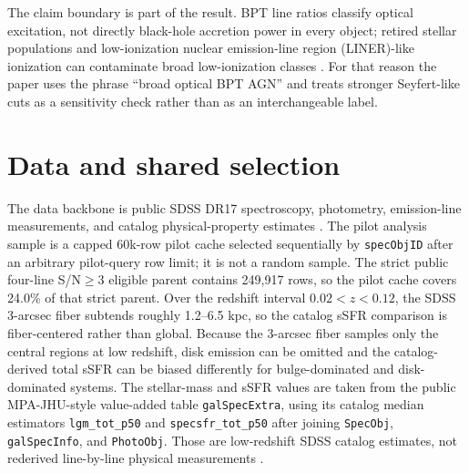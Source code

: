 \documentclass[twocolumn]{aastex631}
\begin{document}
The claim boundary is part of the result. BPT line ratios classify optical excitation, not directly black-hole accretion power in every object; retired stellar populations and low-ionization nuclear emission-line region (LINER)-like ionization can contaminate broad low-ionization classes \citep{stasinska2008,stasinska2015}. For that reason the paper uses the phrase ``broad optical BPT AGN'' and treats stronger Seyfert-like cuts as a sensitivity check rather than as an interchangeable label.

\section{Data and shared selection}
The data backbone is public SDSS DR17 spectroscopy, photometry, emission-line measurements, and catalog physical-property estimates \citep{york2000,sdssdr17,brinchmann2004}. The pilot analysis sample is a capped 60k-row pilot cache selected sequentially by \texttt{specObjID} after an arbitrary pilot-query row limit; it is not a random sample. The strict public four-line S/N$\geq3$ eligible parent contains 249,917 rows, so the pilot cache covers 24.0\% of that strict parent.
Over the redshift interval $0.02<z<0.12$, the SDSS 3-arcsec fiber subtends roughly 1.2--6.5 kpc, so the catalog sSFR comparison is fiber-centered rather than global.
Because the 3-arcsec fiber samples only the central regions at low redshift, disk emission can be omitted and the catalog-derived total sSFR can be biased differently for bulge-dominated and disk-dominated systems.
The stellar-mass and sSFR values are taken from the public MPA-JHU-style value-added table \texttt{galSpecExtra}, using its catalog median estimators \texttt{lgm\_tot\_p50} and \texttt{specsfr\_tot\_p50} after joining \texttt{SpecObj}, \texttt{galSpecInfo}, and \texttt{PhotoObj}. Those are low-redshift SDSS catalog estimates, not rederived line-by-line physical measurements \citep{brinchmann2004,sdssdr17,york2000}.
\end{document}
